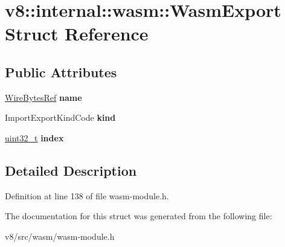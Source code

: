 \hypertarget{structv8_1_1internal_1_1wasm_1_1WasmExport}{}\section{v8\+:\+:internal\+:\+:wasm\+:\+:Wasm\+Export Struct Reference}
\label{structv8_1_1internal_1_1wasm_1_1WasmExport}
\subsection*{Public Attributes}
\begin{DoxyCompactItemize}
\item 
\mbox{\label{structv8_1_1internal_1_1wasm_1_1WasmExport_a1ff9d7bffbb3dc90218cf0ae17db6fec}} 
\mbox{\hyperlink{classv8_1_1internal_1_1wasm_1_1WireBytesRef}{Wire\+Bytes\+Ref}} {\bfseries name}
\item 
\mbox{\label{structv8_1_1internal_1_1wasm_1_1WasmExport_a44af43dfcc6d4e709d4f3183e857bb95}} 
Import\+Export\+Kind\+Code {\bfseries kind}
\item 
\mbox{\label{structv8_1_1internal_1_1wasm_1_1WasmExport_ab9963a7a72c1af0a8747632d7a9f49be}} 
\mbox{\hyperlink{classuint32__t}{uint32\+\_\+t}} {\bfseries index}
\end{DoxyCompactItemize}


\subsection{Detailed Description}


Definition at line 138 of file wasm-\/module.\+h.



The documentation for this struct was generated from the following file\+:\begin{DoxyCompactItemize}
\item 
v8/src/wasm/wasm-\/module.\+h\end{DoxyCompactItemize}
